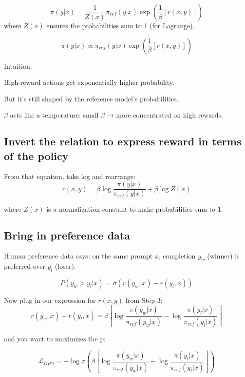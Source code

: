\documentclass[]{article}
\begin{document}
$$
\pi(y|x) = \frac{1}{Z(x)} \pi_{ref}(y|x)\exp({\frac{1}{\beta}[r(x,y)]})
$$
where $Z(x)$ ensures the probabilities sum to 1 (for Lagrange).

$$
\pi(y|x) \propto \pi_{ref}(y|x)\exp({\frac{1}{\beta}[r(x,y)]})
$$

Intuition:

High-reward actions get exponentially higher probability.

But it’s still shaped by the reference model’s probabilities.

$\beta$ acts like a temperature: small $\beta$ → more concentrated on high rewards.

\subsection{Invert the relation to express reward in terms of the policy}

From that equation, take log and rearrange:
$$
    r(x,y) = \beta \log \frac{\pi(y|x)}{\pi_{ref}(y|x)} + \beta \log Z(x)
$$

where $Z(x)$ is a normalization constant to make probabilities sum to 1.

\subsection{Bring in preference data}
Human preference data says: on the same prompt $x$, completion $y_w$ (winner) is preferred over $y_{l}$ (loser).

$$
P(y_w > y_l | x) = \sigma(r(y_w, x) - r(y_l, x))
$$

Now plug in our expression for $r(x,y)$ from Step 3:
$$
    r(y_w, x) - r(y_l, x) = \beta [ \log \frac{\pi(y_w|x)}{\pi_{ref}(y_w|x)} - \log \frac{\pi(y_l|x)}{\pi_{ref}(y_l|x)} ]
$$

and you want to maximizes the p:

$$
    \mathcal{L}_{DPO} = -\log \sigma (\beta [ \log \frac{\pi(y_w|x)}{\pi_{ref}(y_w|x)} - \log \frac{\pi(y_l|x)}{\pi_{ref}(y_l|x)} ]
)
$$
\end{document}
